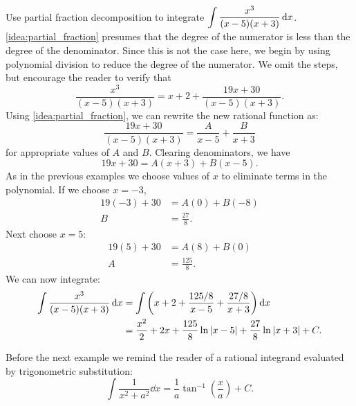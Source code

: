 \begin{example}\label{ex_pf4}%
Use partial fraction decomposition to integrate $\displaystyle \int \frac{x^3}{(x-5)(x+3)}\operatorname{d}\! x$.
\solution
\autoref{idea:partial_fraction} presumes that the degree of the numerator is less than the degree of the denominator. Since this is not the case here, we begin by using polynomial division to reduce the degree of the numerator. We omit the steps, but encourage the reader to verify that
\[\frac{x^3}{(x-5)(x+3)} = x+2+\frac{19x+30}{(x-5)(x+3)}.\]
Using \autoref{idea:partial_fraction}, we can rewrite the new rational function as:
\[\frac{19x+30}{(x-5)(x+3)} = \frac{A}{x-5} + \frac{B}{x+3}\]
for appropriate values of $A$ and $B$. Clearing denominators, we have 
\[19x+30=A(x+3)+B(x-5).\]
As in the previous examples we choose values of $x$ to eliminate terms in the polynomial.  If we choose $x=-3$,
\begin{align*}
 19(-3)+30&=A(0) + B(-8) \\
 B&= \frac{27}{8}.
\end{align*}
Next choose $x=5$:
\begin{align*}
 19(5)+30&=A(8) + B(0)\\
 A&= \frac{125}{8}.
\end{align*}
We can now integrate:
\begin{align*}
	\int \frac{x^3}{(x-5)(x+3)}\operatorname{d}\! x
	&= \int\left(x+2+\frac{125/8}{x-5}+\frac{27/8}{x+3}\right)\operatorname{d}\! x \\
	&= \frac{x^2}2+2x+\frac{125}{8}\ln\left\lvert x-5 \right\rvert+\frac{27}8\ln\left\lvert x+3 \right\rvert+C.
\end{align*}
\end{example}

Before the next example we remind the reader of a rational integrand evaluated by trigonometric substitution:
\[\int\frac1{x^2+a^2}\dd x=\frac1a\tan^{-1}\left(\frac xa\right) + C.\]

